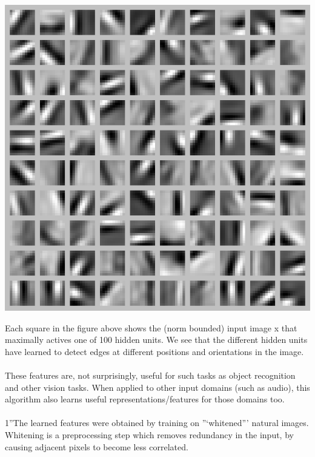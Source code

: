 \documentclass[conference]{IEEEtran}
\begin{document}
\centerline{\includegraphics[scale=0.38]{ExampleSparseAutoencoderWeights.png}}
Each square in the figure above shows the (norm bounded) input image x that maximally actives one of 100 hidden units. We see that the different hidden units have learned to detect edges at different positions and orientations in the image.\\ \\
These features are, not surprisingly, useful for such tasks as object recognition and other vision tasks. When applied to other input domains (such as audio), this algorithm also learns useful representations/features for those domains too.\\ \\
1”The learned features were obtained by training on ”‘whitened”’ natural images. Whitening is a preprocessing step which removes redundancy in the input, by causing adjacent pixels to become less correlated.
\end{document}
